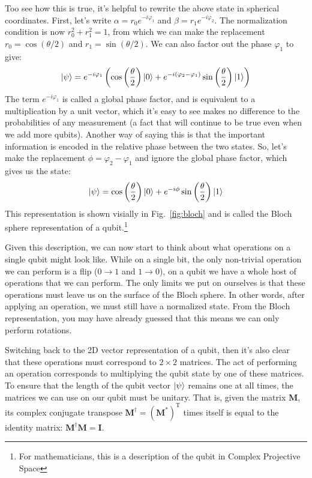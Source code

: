 Too see how this is true, it's helpful to rewrite the above state in spherical coordinates. First, let's
write $\alpha = r_0e^{-i\varphi_1}$ and $\beta = r_1e^{-i\varphi_2}$. The normalization condition is now
$r_0^2 + r_1^2 = 1$, from which we can make the replacement $r_0 = \cos(\theta/2)$ and $r_1 = \sin(\theta/2)$.
We can also factor out the phase $\varphi_1$ to give:
\begin{equation}
\ket{\psi} = e^{-i\varphi_1}\left(
    \cos\left(\frac{\theta}{2}\right)\ket{0} + e^{-i(\varphi_2 - \varphi_1)}\sin\left(\frac{\theta}{2}\right)\ket{1}
  \right)
\end{equation}
The term $e^{-i\varphi_1}$ is called a global phase factor, and is equivalent to a multiplication by a unit vector,
which it's easy to see makes no difference to the probabilities of any measurement (a fact that will continue to be
true even when we add more qubits). Another way of saying this is that the important information is encoded in
the relative phase between the two states. So, let's make the replacement $\phi = \varphi_2 - \varphi_1$ and ignore
the global phase factor, which gives us the state:
\begin{equation}
  \ket{\psi} = \cos\left(\frac{\theta}{2}\right)\ket{0} + e^{-i\phi}\sin\left(\frac{\theta}{2}\right)\ket{1}
\end{equation}
This representation is shown visially in Fig.~\ref{fig:bloch} and is called the Bloch sphere representation
of a qubit.\footnote{For mathematicians, this is a description of the qubit in Complex Projective Space}

Given this description, we can now start to think about what operations on a single qubit might look like.
While on a single bit, the only non-trivial operation we can perform is a flip ($0 \rightarrow 1$ and $1 \rightarrow 0$),
on a qubit we have a whole host of operations that we can perform. The only limits we put on ourselves is that these operations
must leave us on the surface of the Bloch sphere. In other words, after applying an operation, we must still
have a normalized state. From the Bloch representation, you may have already guessed that this means we
can only perform rotations.

Switching back to the 2D vector representation of a qubit, then it's also clear that these operations
must correspond to $2\times2$ matrices. The act of performing an operation corresponds to multiplying
the qubit state by one of these matrices. To ensure that the length of the qubit vector $\ket{\psi}$
remains one at all times, the matrices we can use on our qubit must be unitary. That is, given the matrix $\boldsymbol{M}$,
its complex conjugate transpose $\boldsymbol{M}^\dagger = (\boldsymbol{M^{*}})^\mathrm{T}$ times itself is equal to
the identity matrix: $\boldsymbol{M}^\dagger\boldsymbol{M} = \boldsymbol{I}$.

